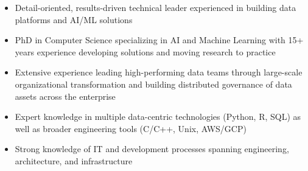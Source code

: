 \documentclass[letterpaper,10pt]{cvclean}
\begin{document}
\setmainfont[Mapping=tex-text]{Cambria}
\makeheader


\begin{Professional Summary}%
  \begin{itemize}
    \item Detail-oriented, results-driven technical leader experienced in building
      data platforms and AI/ML solutions
    \item PhD in Computer Science specializing in AI and Machine Learning with 15+ years
      experience developing solutions and moving research to practice
    \item Extensive experience leading high-performing data teams through large-scale
      organizational transformation and building distributed governance of data
      assets across the enterprise
    \item Expert knowledge in multiple data-centric technologies (Python, R,
      SQL) as well as broader engineering tools (C/C++, Unix, AWS/GCP)
    \item Strong knowledge of IT and development processes spanning engineering, architecture, and
      infrastructure
    \end{itemize}
\end{Professional Summary}
\end{document}
